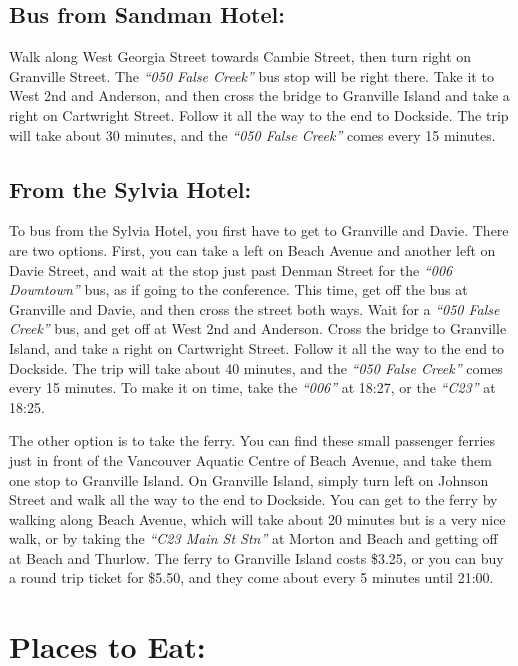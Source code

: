 \documentclass[letterpaper,12pt]{article}
\newcommand{\bus}[1]{\textit{``#1''}}
\begin{document}
\subsection*{Bus from Sandman Hotel:}

Walk along West Georgia Street towards Cambie Street, then turn right on Granville Street. The \bus{050 False Creek} bus stop will be right there. Take it to West 2nd and Anderson, and then cross the bridge to Granville Island and take a right on Cartwright Street. Follow it all the way to the end to Dockside. The trip will take about 30 minutes, and the \bus{050 False Creek} comes every 15 minutes.

\subsection*{From the Sylvia Hotel:}

To bus from the Sylvia Hotel, you first have to get to Granville and Davie. There are two options. First, you can take a left on Beach Avenue and another left on Davie Street, and wait at the stop just past Denman Street for the \bus{006 Downtown} bus, as if going to the conference. This time, get off the bus at Granville and Davie, and then cross the street both ways. Wait for a \bus{050 False Creek} bus, and get off at West 2nd and Anderson. Cross the bridge to Granville Island, and take a right on Cartwright Street. Follow it all the way to the end to Dockside. The trip will take about 40 minutes, and the \bus{050 False Creek} comes every 15 minutes. To make it on time, take the \bus{006} at 18:27, or the \bus{C23} at 18:25.

The other option is to take the ferry. You can find these small passenger ferries just in front of the Vancouver Aquatic Centre of Beach Avenue, and take them one stop to Granville Island. On Granville Island, simply turn left on Johnson Street and walk all the way to the end to Dockside. You can get to the ferry by walking along Beach Avenue, which will take about 20 minutes but is a very nice walk, or by taking the \bus{C23 Main St Stn} at Morton and Beach and getting off at Beach and Thurlow. The ferry to Granville Island costs \$3.25, or you can buy a round trip ticket for \$5.50, and they come about every 5 minutes until 21:00.

\section*{Places to Eat:}
\end{document}
